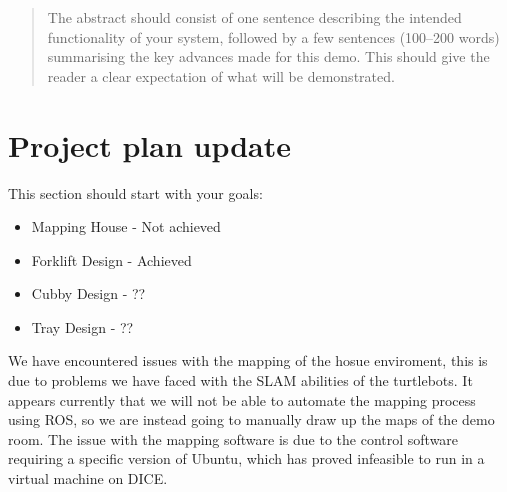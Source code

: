 \documentclass{article}
\begin{document}
 



\begin{abstract} 
The abstract should consist of one sentence describing the intended functionality of your system, followed by a few sentences (100--200 words) summarising the key advances made for this demo. This should give the reader a clear expectation of what will be demonstrated.
\end{abstract} 


\section{Project plan update} 

This section should start with your goals:
\begin{itemize}
    \item Mapping House - Not achieved
    \item Forklift Design - Achieved 
    \item Cubby Design - ??
    \item Tray Design - ??
\end{itemize}

We have encountered issues with the mapping of the hosue enviroment, this is due to problems we have faced with the SLAM abilities of the turtlebots. 
It appears currently that we will not be able to automate the mapping process using ROS, so we are instead going to manually draw up the maps of the demo room.
The issue with the mapping software is due to the control software requiring a specific version of Ubuntu, which has proved infeasible to run in a virtual machine on DICE.




\end{document}
